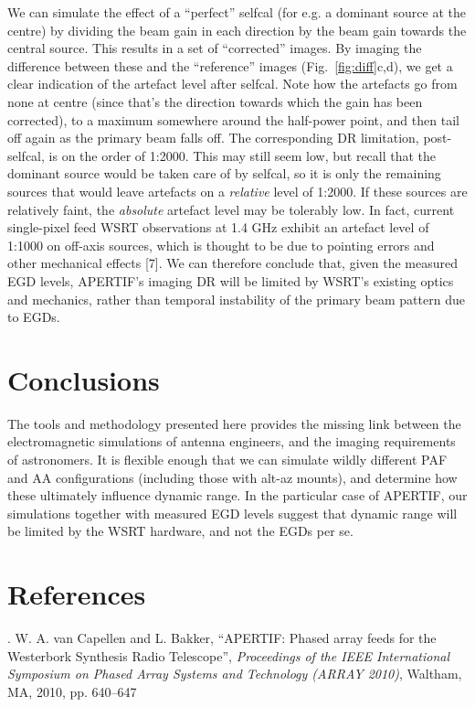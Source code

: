 \documentclass{aps2010} \special{papersize=8.5in,11in}
\begin{document}
We can simulate the effect of a ``perfect'' selfcal (for e.g. a dominant source at the centre) by dividing the beam gain in each direction by the beam gain towards the central source. This results in a set of ``corrected'' images. By imaging the difference between these and the ``reference'' images (Fig.~\ref{fig:diff}c,d), we get a clear indication of the artefact level after selfcal. Note how the artefacts go from none at centre (since that's the direction towards which the gain has been corrected), to a maximum somewhere around the half-power point, and then tail off again as the primary beam falls off. The corresponding DR limitation, post-selfcal, is on the order of 1:2000. This may still seem low, but recall that the dominant source would be taken care of by selfcal, so it is only the remaining sources that would leave artefacts on a \emph{relative} level of 1:2000. If these sources are relatively faint, the \emph{absolute} artefact level may be tolerably low. In fact, current single-pixel feed WSRT observations at 1.4 GHz exhibit an artefact level of 1:1000 on off-axis sources, which is thought to be due to pointing errors and other mechanical effects [7]. We can therefore conclude that, given the measured EGD levels, APERTIF's imaging DR will be limited by WSRT's existing optics and mechanics, rather than temporal instability of the primary beam pattern due to EGDs.

\section{Conclusions}

\noindent The tools and methodology presented here provides the missing link between the electromagnetic simulations of antenna engineers, and the  imaging requirements of astronomers. It is flexible enough that we can simulate wildly different PAF and AA configurations (including those with alt-az mounts), and determine how these ultimately influence dynamic range. In the particular case of APERTIF, our simulations together with measured EGD levels suggest that dynamic range will be limited by the WSRT hardware, and not the EGDs per se. 

\section{References}

. W. A. van Capellen and L. Bakker, ``APERTIF: Phased array feeds for the Westerbork Synthesis Radio Telescope'', \emph{Proceedings of the IEEE International Symposium on Phased Array Systems and Technology (ARRAY 2010)}, Waltham, MA, 2010, pp. 640--647
\end{document}
